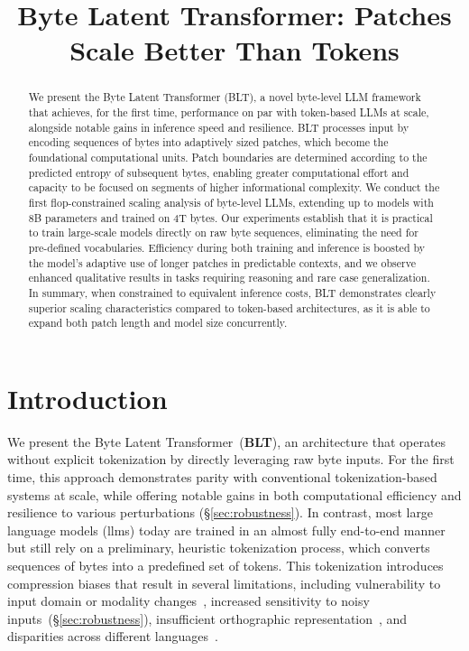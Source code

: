 \title{Byte Latent Transformer: Patches Scale Better Than Tokens}

\begin{abstract}
We present the Byte Latent Transformer ({\textsc BLT}), a novel byte-level LLM framework that achieves, for the first time, performance on par with token-based LLMs at scale, alongside notable gains in inference speed and resilience. 
{\textsc BLT} processes input by encoding sequences of bytes into adaptively sized patches, which become the foundational computational units. Patch boundaries are determined according to the predicted entropy of subsequent bytes, enabling greater computational effort and capacity to be focused on segments of higher informational complexity. We conduct the first flop-constrained scaling analysis of byte-level LLMs, extending up to models with 8B parameters and trained on 4T bytes. Our experiments establish that it is practical to train large-scale models directly on raw byte sequences, eliminating the need for pre-defined vocabularies. Efficiency during both training and inference is boosted by the model’s adaptive use of longer patches in predictable contexts, and we observe enhanced qualitative results in tasks requiring reasoning and rare case generalization. In summary, when constrained to equivalent inference costs, {\textsc BLT} demonstrates clearly superior scaling characteristics compared to token-based architectures, as it is able to expand both patch length and model size concurrently.
\end{abstract}

\section{Introduction}
\label{section:intro}

We present the Byte Latent Transformer~(\textbf{BLT}), an architecture that operates without explicit tokenization by directly leveraging raw byte inputs. For the first time, this approach demonstrates parity with conventional tokenization-based systems at scale, while offering notable gains in both computational efficiency and resilience to various perturbations (\S\ref{sec:robustness}). 
In contrast, most large language models (llms) today are trained in an almost fully end-to-end manner but still rely on a preliminary, heuristic tokenization process, which converts sequences of bytes into a predefined set of tokens. This tokenization introduces compression biases that result in several limitations, including vulnerability to input domain or modality changes~\citep{dagangetting}, increased sensitivity to noisy inputs~(\S\ref{sec:robustness}), insufficient orthographic representation~\citep{edman2024cute}, and disparities across different languages~\citep{liang2023xlm,petrov2024language,limisiewicz2024myte}.

